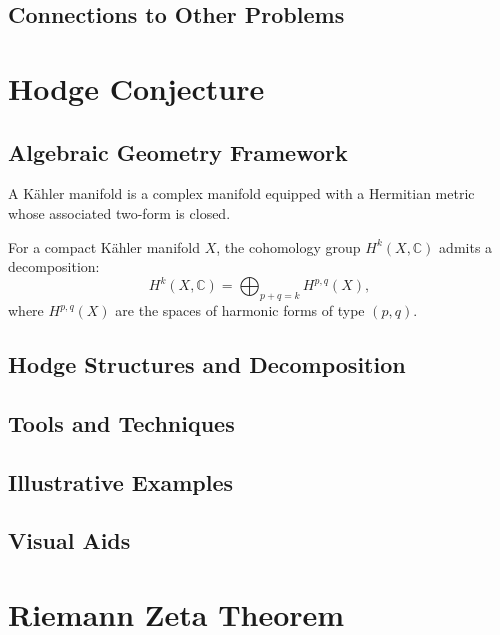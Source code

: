 \documentclass[12pt, a4paper]{article}
\theoremstyle{definitionstyle}
\begin{document}
\subsection{Connections to Other Problems}

\section{Hodge Conjecture}
\subsection{Algebraic Geometry Framework}
\begin{definition}
A Kähler manifold is a complex manifold equipped with a Hermitian metric whose associated two-form is closed.
\end{definition}

\begin{definition}
For a compact Kähler manifold $X$, the cohomology group $H^k(X, \mathbb{C})$ admits a decomposition:
\[
H^k(X, \mathbb{C}) = \bigoplus_{p+q=k} H^{p,q}(X),
\]
where $H^{p,q}(X)$ are the spaces of harmonic forms of type $(p,q)$.
\end{definition}

\subsection{Hodge Structures and Decomposition}

\subsection{Tools and Techniques}

\subsection{Illustrative Examples}

\subsection{Visual Aids}

\section{Riemann Zeta Theorem}
\end{document}
